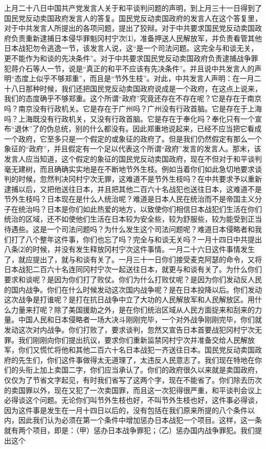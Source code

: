\documentclass[UTF-8, a5paper, 12pt]{ctexart}
\begin{document}
上月二十八日中国共产党发言人关于和平谈判问题的声明，到上月三十一日得到了国民党反动卖国政府发言人的答复。国民党反动卖国政府的发言人在这个答复里，对于中共发言人所提出的各项问题，提出了狡辩。对于中共要求国民党反动卖国政府负责重新逮捕日本侵华罪魁冈村宁次⑴，准备押送人民解放军，并负责看管其他日本战犯勿令逃逸一节，该发言人说，这“是一个司法问题。这完全与和谈无关，更不能作为和谈的先决条件”。对于中共要求国民党反动卖国政府负责逮捕战争罪犯蒋介石等人一节，说是“真正的和平不应该有先决条件”。并且说中共发言人的声明“态度上似乎不够郑重”，而且是“节外生枝”。对此，中共发言人声明：在一月二十八日那种时候，我们还把国民党反动卖国政府说成是一个政府，在这点上说来，我们的态度确乎不够郑重。这个所谓“政府”究竟还存在不存在呢？它是存在于南京吗？南京没有行政机关。它是存在于广州吗？广州没有行政首脑。它是存在于上海吗？上海既没有行政机关，又没有行政首脑。它是存在于奉化吗？奉化只有一个宣布“退休”了的伪总统，别的什么都没有。因此郑重地说起来，已经不应当把它看成一个政府，它至多只是一个假定的或象征的政府了。但是我们仍然假定有那么一个象征的“政府”，并且假定有一个足以代表这个所谓“政府”发言的发言人。那末，该发言人应当知道，这个假定的象征的国民党反动卖国政府，现在不但对于和平谈判毫无建树，而且确确实实地是在不断地节外生枝。例如当着你们如此急切地要求谈判的时候，忽然判决冈村宁次无罪，这难道不是节外生枝吗？在中共要求予以重新逮捕以后，又把他送往日本，并且把其他二百六十名战犯也送往日本，这难道不是节外生枝吗？日本现在是什么人统治呢？难道是日本人民在统治而不是帝国主义分子在统治吗？日本是你们如此热爱的地方，以致使你们相信日本战犯们生活在你们统治的区域，还不如使他们生活在日本较为安全些，较为舒服些，较为能受到正当待遇些。这是一个司法问题吗？为什么发生这个司法问题呢？难道日本侵略者和我们打了八个整年这件事，你们也忘了吗？完全与和谈无关吗？一月十四日中共提出八条⑵的时候，并没有发生释放冈村宁次这件事情。一月二十六日这件事情发生了，就应提出了，就与和谈有关了。一月三十一日你们接受麦克阿瑟的命令，又将日本战犯二百六十名连同冈村宁次一起送往日本，就更与和谈有关了。为什么你们要求和谈呢？是因为你们打了败仗。你们为什么打败仗呢？是因为你们发动反人民的国内战争。你们在什么时候发动这次国内战争呢？是在日本投降以后。你们发动这次战争是打谁呢？是打在抗日战争中立了大功的人民解放军和人民解放区。用什么力量来打呢？除了美国援助之外，是在你们统治区域从人民方面捉来和刮来的力量。中国人民和日本侵略者一场大决斗刚刚完毕，一个对外战争刚刚完毕，你们就发动这次对内战争。你们打败了，要求谈判，忽然又宣告日本首要战犯冈村宁次无罪。我们刚刚向你们提出抗议，要求你们重新监禁冈村宁次并准备交给人民解放军，你们又慌忙将他和其他二百六十名日本战犯一齐送往日本。国民党反动卖国政府的先生们，你们这件事做得太无道理了，太违反人民意志了。我们现在特地在你们的头衔上加上卖国二字，你们应当承认了。你们的政府很久以来就是卖国政府，仅仅为了节省文字起见，有时我们省写了这两个字，现在不能省了。你们除去历次的卖国罪以外，现在又犯了一次卖国罪，而且这一次犯得很严重，和平谈判会议上必得谈这个问题。无论你们叫节外生枝也好，不叫节外生枝也好，这件事必得谈，因为这件事是发生在一月十四日以后的，没有包括在我们原来所提的八个条件以内，因此我们认为必须在第一个条件中增加惩办日本战犯一个项目。这样，这一条就有两个项目，即是：（甲）惩办日本战争罪犯；（乙）惩办国内战争罪犯。我们提出这个
\end{document}
